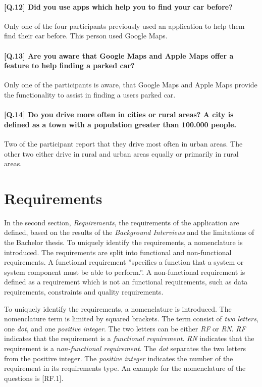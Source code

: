 \paragraph{[Q.12] Did you use apps which help you to find your car before?}
Only one of the four participants previously used an application to help them find their car before. This person used Google Maps.

\paragraph{[Q.13] Are you aware that Google Maps and Apple Maps offer a feature to help finding a parked car?}
Only one of the participants is aware, that Google Maps and Apple Maps provide the functionality to assist in finding a users parked car. 

\paragraph{[Q.14] Do you drive more often in cities or rural areas? A city is defined as a town with a population greater than 100.000 people.}
Two of the participant report that they drive most often in urban areas. The other two either drive in rural and urban areas equally or primarily in rural areas.


\section{Requirements}
In the second section, \textit{Requirements}, the requirements of the application are defined, based on the results of the \textit{Background Interviews} and the limitations of the Bachelor thesis. To uniquely identify the requirements, a nomenclature is introduced. The requirements are split into functional and non-functional requirements. A functional requirement ''specifies a function that a system or system component must be able to perform.''. A non-functional requirement is defined as a requirement which is not an functional requirements, such as data requirements, constraints and quality requirements. \cite{eide2005quantification}

To uniquely identify the requirements, a nomenclature is introduced. The nomenclature term is limited by squared brackets. The term consist of \textit{two letters}, one \textit{dot}, and one \textit{positive integer}. The two letters can be either \textit{RF} or \textit{RN}. \textit{RF} indicates that the requirement is a \textit{functional requirement}. \textit{RN} indicates that the requirement is a \textit{non-functional requirement}. The \textit{dot} separates the two letters from the positive integer. The \textit{positive integer} indicates the number of the requirement in its requirements type. An example for the nomenclature of the questions is [RF.1].


